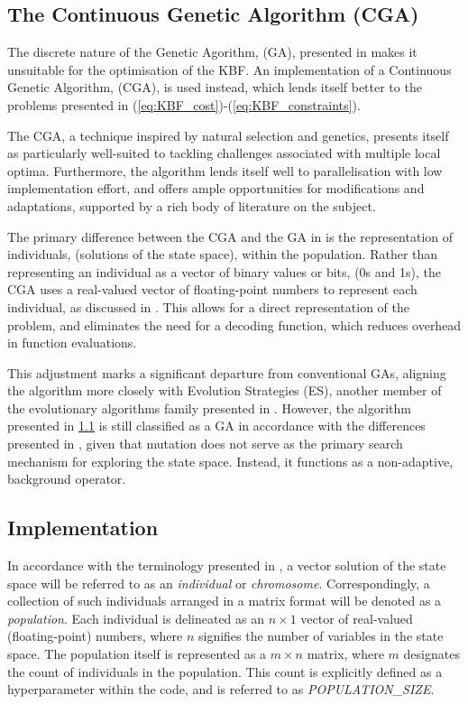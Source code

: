 \documentclass[10pt]{article}
\begin{document}
\begin{multicols}{2}
\section{The Continuous Genetic Algorithm (CGA)}
\label{sec:CGA}

The discrete nature of the Genetic Agorithm, (GA), presented in \cite{parks2023geneticalgorithms} makes it unsuitable for the optimisation of the KBF. An implementation of a Continuous Genetic Algorithm, (CGA), is used instead, which lends itself better to the problems presented in (\ref{eq:KBF_cost})-(\ref{eq:KBF_constraints}).

The CGA, a technique inspired by natural selection and genetics, presents itself as particularly well-suited to tackling challenges associated with multiple local optima. Furthermore, the algorithm lends itself well to parallelisation with low implementation effort, and offers ample opportunities for modifications and adaptations, supported by a rich body of literature on the subject.

The primary difference between the CGA and the GA in \cite{parks2023geneticalgorithms} is the representation of individuals, (solutions of the state space), within the population. Rather than representing an individual as a vector of binary values or bits, (0s and 1s), the CGA uses a real-valued vector of floating-point numbers to represent each individual, as discussed in \cite{PGA}. This allows for a direct representation of the problem, and eliminates the need for a decoding function, which reduces overhead in function evaluations.

This adjustment marks a significant departure from conventional GAs, aligning the algorithm more closely with Evolution Strategies (ES), another member of the evolutionary algorithms family presented in \cite{salimans2017evolution}. However, the algorithm presented in \ref{sec:CGA_implementation} is still classified as a GA in accordance with the differences presented in \cite{10.1007/BFb0029787}, given that mutation does not serve as the primary search mechanism for exploring the state space. Instead, it functions as a non-adaptive, background operator.

\subsection{Implementation}
\label{sec:CGA_implementation}

In accordance with the terminology presented in \cite{parks2023geneticalgorithms}, a vector solution of the state space will be referred to as an \textit{individual} or \textit{chromosome}. Correspondingly, a collection of such individuals arranged in a matrix format will be denoted as a \textit{population}. Each individual is delineated as an $n \times 1$ vector of real-valued (floating-point) numbers, where $n$ signifies the number of variables in the state space. The population itself is represented as a $m \times n$ matrix, where $m$ designates the count of individuals in the population. This count is explicitly defined as a hyperparameter within the code, and is referred to as \textit{POPULATION\_SIZE}.


\end{multicols}
\end{document}
